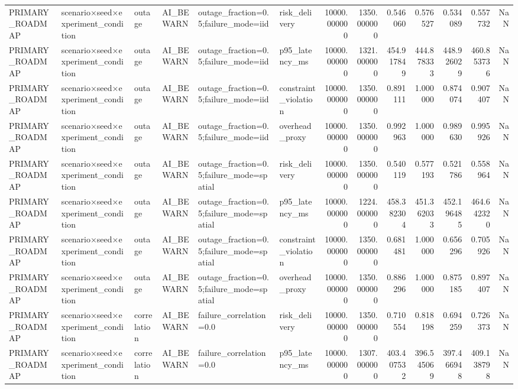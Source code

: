 \begin{tabular}{llllllrrrrrrr}
PRIMARY\_ROADMAP & scenario×seed×experiment\_condition & outage & AI\_BEWARN & outage\_fraction=0.5;failure\_mode=iid & risk\_delivery & 10000.000000 & 1350.000000 & 0.546060 & 0.576527 & 0.534089 & 0.557732 & NaN \\
PRIMARY\_ROADMAP & scenario×seed×experiment\_condition & outage & AI\_BEWARN & outage\_fraction=0.5;failure\_mode=iid & p95\_latency\_ms & 10000.000000 & 1321.000000 & 454.917849 & 444.878333 & 448.926029 & 460.853736 & NaN \\
PRIMARY\_ROADMAP & scenario×seed×experiment\_condition & outage & AI\_BEWARN & outage\_fraction=0.5;failure\_mode=iid & constraint\_violation & 10000.000000 & 1350.000000 & 0.891111 & 1.000000 & 0.874074 & 0.907407 & NaN \\
PRIMARY\_ROADMAP & scenario×seed×experiment\_condition & outage & AI\_BEWARN & outage\_fraction=0.5;failure\_mode=iid & overhead\_proxy & 10000.000000 & 1350.000000 & 0.992963 & 1.000000 & 0.989630 & 0.995926 & NaN \\
PRIMARY\_ROADMAP & scenario×seed×experiment\_condition & outage & AI\_BEWARN & outage\_fraction=0.5;failure\_mode=spatial & risk\_delivery & 10000.000000 & 1350.000000 & 0.540119 & 0.577193 & 0.521786 & 0.558964 & NaN \\
PRIMARY\_ROADMAP & scenario×seed×experiment\_condition & outage & AI\_BEWARN & outage\_fraction=0.5;failure\_mode=spatial & p95\_latency\_ms & 10000.000000 & 1224.000000 & 458.382304 & 451.362033 & 452.196485 & 464.642320 & NaN \\
PRIMARY\_ROADMAP & scenario×seed×experiment\_condition & outage & AI\_BEWARN & outage\_fraction=0.5;failure\_mode=spatial & constraint\_violation & 10000.000000 & 1350.000000 & 0.681481 & 1.000000 & 0.656296 & 0.705926 & NaN \\
PRIMARY\_ROADMAP & scenario×seed×experiment\_condition & outage & AI\_BEWARN & outage\_fraction=0.5;failure\_mode=spatial & overhead\_proxy & 10000.000000 & 1350.000000 & 0.886296 & 1.000000 & 0.875185 & 0.897407 & NaN \\
PRIMARY\_ROADMAP & scenario×seed×experiment\_condition & correlation & AI\_BEWARN & failure\_correlation=0.0 & risk\_delivery & 10000.000000 & 1350.000000 & 0.710554 & 0.818198 & 0.694259 & 0.726373 & NaN \\
PRIMARY\_ROADMAP & scenario×seed×experiment\_condition & correlation & AI\_BEWARN & failure\_correlation=0.0 & p95\_latency\_ms & 10000.000000 & 1307.000000 & 403.407532 & 396.545069 & 397.466948 & 409.138798 & NaN \\

\end{tabular}
